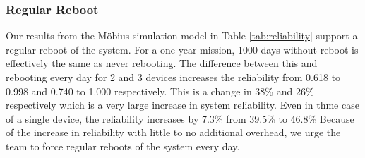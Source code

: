 \subsubsection{Regular Reboot} Our results from the M\"obius simulation model
in Table \ref{tab:reliability} support a regular reboot of the system. For a one year
mission, 1000 days without reboot is effectively the same as never rebooting. The
difference between this and rebooting every day for 2 and 3 devices increases the
reliability from 0.618 to 0.998 and 0.740 to 1.000 respectively. This is a change in
38\% and 26\% respectively which is a very large increase in system reliability. 
Even in thme case of a single device, the reliability increases by 7.3\% from 39.5\%
to 46.8\% Because of the increase in reliability with little to no additional overhead, 
we urge the team to force regular reboots of the system every day.
